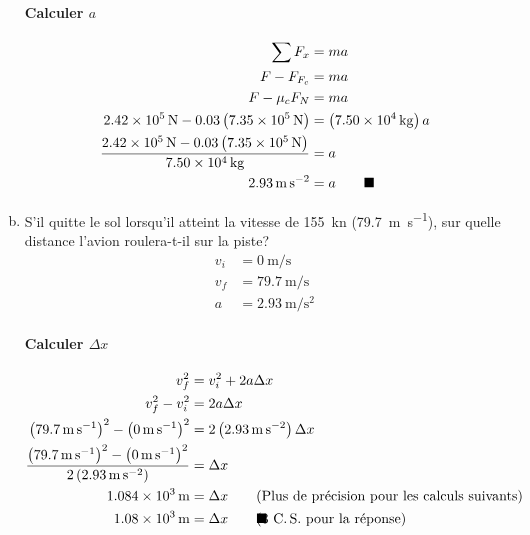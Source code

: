 \documentclass[letterpaper]{article}
\newcommand{\qed}{\rlap{$\qquad \blacksquare$}}
\begin{document}
\begin{enumerate}[a)]
        \paragraph*{Calculer $a$}
        \begin{align*}
            \sum F_x &= ma \\
            F - F_{F_c} &= ma \\
            F - \mu_cF_N &= ma \\
            \qty{2.42e5}{\newton} - \num{0.03}\left(\qty{7.35e5}{\newton}\right) &= \left(\qty{7.50e4}{\kilogram}\right)a \\
            \frac{\qty{2.42e5}{\newton} - \num{0.03}\left(\qty{7.35e5}{\newton}\right)}{\qty{7.50e4}{\kilogram}} &= a \\
            \qty{2.93}{\metre\per\second\squared} &= a \qed
        \end{align*}
        
    \filbreak
    \item
        S'il quitte le sol lorsqu'il atteint la vitesse de \qty{155}{\knot} (\qty{79.7}{\metre\per\second}), sur quelle distance l'avion roulera-t-il sur la piste?
        \begin{align*}
            v_i &= \qty{0}{\metre\per\second} \\
            v_f &= \qty{79.7}{\metre\per\second} \\
            a &= \qty{2.93}{\metre\per\second\squared}
        \end{align*}

        \paragraph*{Calculer $\Delta x$}
        \begin{align*}
            v_f^2 &= v_i^2 + 2a\Delta x \\
            v_f^2 - v_i^2 &= 2a\Delta x \\
            \left(\qty{79.7}{\metre\per\second}\right)^2 - \left(\qty{0}{\metre\per\second}\right)^2 &= 2\left(\qty{2.93}{\metre\per\second\squared}\right)\Delta x \\
            \frac{\left(\qty{79.7}{\metre\per\second}\right)^2 - \left(\qty{0}{\metre\per\second}\right)^2}{2\left(\qty{2.93}{\metre\per\second\squared}\right)} &= \Delta x \\
            \qty{1.084e3}{\metre} &= \Delta x \tag{Plus de pr\'ecision pour les calculs suivants} \\
            \qty{1.08e3}{\metre} &= \Delta x \qed \tag{3 C.\,S. pour la r\'eponse}\\
        \end{align*}
        

\end{enumerate}
\end{document}
